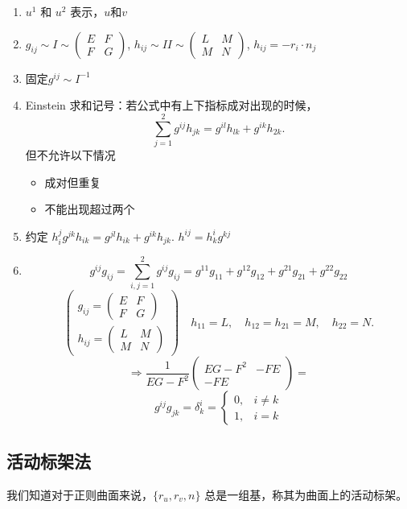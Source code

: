 \documentclass[lang=cn,10pt,thmcnt=section]{elegantbook}
\begin{document}
\begin{enumerate}
    \item $u^1$ 和 $u^2$ 表示，$u \text{和}v$
    \item $g_{ij} \sim I \sim \begin{pmatrix} E & F \\ F & G \end{pmatrix}$, \quad $h_{ij} \sim II \sim \begin{pmatrix} L & M \\ M & N \end{pmatrix}$, \quad $h_{ij} = -r_i \cdot n_j$
    \item 固定$g^{ij}\sim I^{-1}$
    \item Einstein 求和记号：若公式中有上下指标成对出现的时候，
    \[
    \sum_{j=1}^{2} g^{ij} h_{jk} = g^{il} h_{lk} + g^{ik} h_{2k}.
    \]但不允许以下情况
    \begin{itemize}
        \item 成对但重复
        \item 不能出现超过两个
    \end{itemize}
    \item 约定 $h_i^j  g^{jk} h_{ik} = g^{jl} h_{ik} + g^{ik} h_{jk}$. \quad $h^{ij} = h_k^i g^{kj}$
    \item
    \[
    g^{ij} g_{ij} = \sum_{i,j=1}^{2} g^{ij} g_{ij} = g^{11} g_{11} + g^{12} g_{12} + g^{21} g_{21} + g^{22} g_{22}
    \]
    \[
    \begin{pmatrix} g_{ij} = \begin{pmatrix} E & F \\ F & G \end{pmatrix} \\ h_{ij} = \begin{pmatrix} L & M \\ M & N \end{pmatrix} \end{pmatrix} \quad h_{11} = L, \quad h_{12} = h_{21} = M, \quad h_{22} = N.
    \]
    \[
    \Rightarrow \frac{1}{EG - F^2} \left( \begin{matrix} EG - F^2 & -F E \\ -F E \end{matrix} \right) = 
    \]
    \[
    g^{ij} g_{jk} = \delta_k^i = \begin{cases} 0, & i \neq k \\ 1, & i = k \end{cases}
    \]
\end{enumerate}
\subsection{活动标架法}
我们知道对于正则曲面来说，$\{r_u, r_v, n\}$ 总是一组基，称其为曲面上的活动标架。
\end{document}
